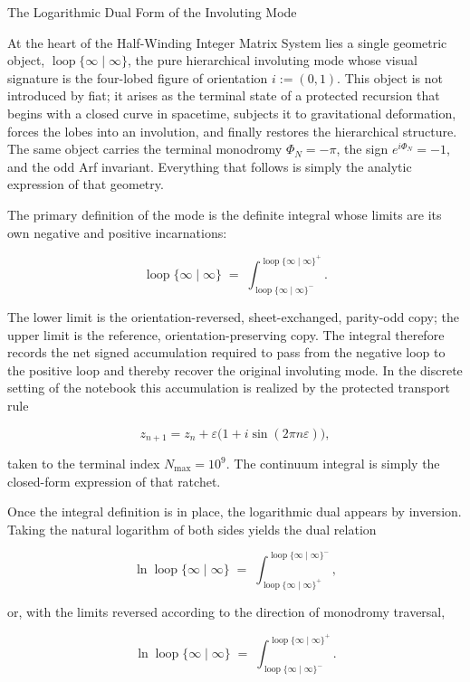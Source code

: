 The Logarithmic Dual Form of the Involuting Mode

At the heart of the Half-Winding Integer Matrix System lies a single geometric object, \(\operatorname{loop}\{\infty\mid\infty\}\), the pure hierarchical involuting mode whose visual signature is the four-lobed figure of orientation \(i:=(0,1)\). This object is not introduced by fiat; it arises as the terminal state of a protected recursion that begins with a closed curve in spacetime, subjects it to gravitational deformation, forces the lobes into an involution, and finally restores the hierarchical structure. The same object carries the terminal monodromy \(\Phi_N=-\pi\), the sign \(e^{i\Phi_N}=-1\), and the odd Arf invariant. Everything that follows is simply the analytic expression of that geometry.

The primary definition of the mode is the definite integral whose limits are its own negative and positive incarnations:

\[
\operatorname{loop}\{\infty\mid\infty\}
\;=\;
\int_{\operatorname{loop}\{\infty\mid\infty\}^{-}}^{\operatorname{loop}\{\infty\mid\infty\}^{+}}.
\]

The lower limit is the orientation-reversed, sheet-exchanged, parity-odd copy; the upper limit is the reference, orientation-preserving copy. The integral therefore records the net signed accumulation required to pass from the negative loop to the positive loop and thereby recover the original involuting mode. In the discrete setting of the notebook this accumulation is realized by the protected transport rule

\[
z_{n+1}=z_n+\varepsilon\bigl(1+i\sin(2\pi n\varepsilon)\bigr),
\]

taken to the terminal index \(N_{\max}=10^9\). The continuum integral is simply the closed-form expression of that ratchet.

Once the integral definition is in place, the logarithmic dual appears by inversion. Taking the natural logarithm of both sides yields the dual relation

\[
\ln\operatorname{loop}\{\infty\mid\infty\}
\;=\;
\int_{\operatorname{loop}\{\infty\mid\infty\}^{+}}^{\operatorname{loop}\{\infty\mid\infty\}^{-}},
\]

or, with the limits reversed according to the direction of monodromy traversal,

\[
\ln\operatorname{loop}\{\infty\mid\infty\}
\;=\;
\int_{\operatorname{loop}\{\infty\mid\infty\}^{-}}^{\operatorname{loop}\{\infty\mid\infty\}^{+}}.
\]

